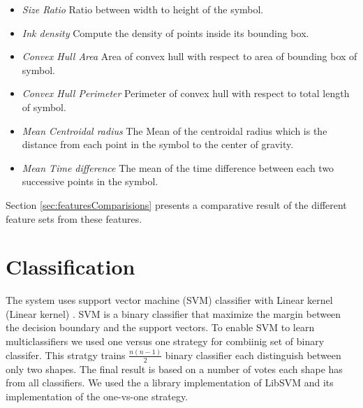  	\begin{itemize}
\item \emph{Size Ratio} Ratio between width to height of the symbol.
	\item \emph{Ink density} Compute the density of points inside its bounding box\cite{GeometryAndDomain102}.   
 	\item \emph{Convex Hull Area} Area of convex hull with respect to area of bounding box of symbol.
	\item \emph{Convex Hull Perimeter} Perimeter of convex hull with respect to total length of symbol.
		\item \emph{Mean Centroidal radius} The Mean of the centroidal radius which is the distance from each point in the symbol to the center of gravity.
	
	\item \emph{Mean Time difference} The mean of the time difference between each two successive points in the symbol. %
  \end{itemize}
  
 Section \ref{sec:featuresComparisions} presents a comparative result of the different feature sets from these features.

\section{Classification}%
\label{sec:Classification}
 The system uses support vector machine (SVM) classifier with Linear kernel (Linear kernel) \cite{libsvm}. SVM is a binary classifier that maximize the margin between the decision boundary and the support vectors. To enable SVM to learn multiclassifiers we used one versus one strategy for combiinig set of binary classifer. This stratgy trains $ \frac{n(n-1)}{{2}}$ binary classifier each distinguish between only two shapes. The final result is based on a number of votes each shape has from all classifiers. We used the a library implementation of LibSVM \cite{libsvm} and its implementation of the one-vs-one strategy.
 